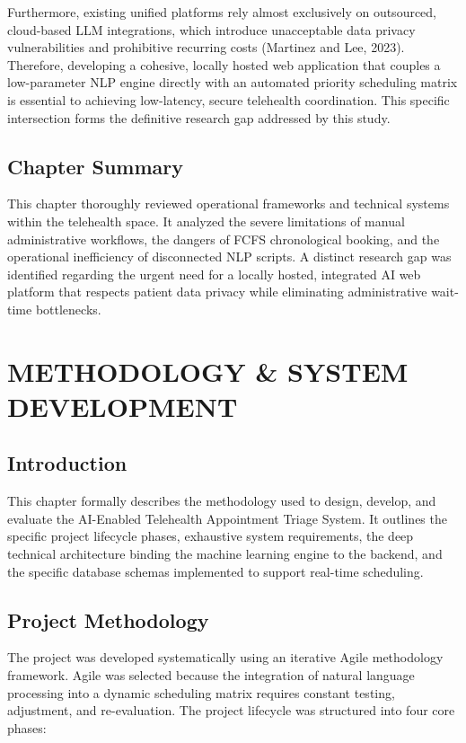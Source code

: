 \documentclass[12pt,a4paper]{report}
\begin{document}
Furthermore, existing unified platforms rely almost exclusively on outsourced, cloud-based LLM integrations, which introduce unacceptable data privacy vulnerabilities and prohibitive recurring costs (Martinez and Lee, 2023). Therefore, developing a cohesive, locally hosted web application that couples a low-parameter NLP engine directly with an automated priority scheduling matrix is essential to achieving low-latency, secure telehealth coordination. This specific intersection forms the definitive research gap addressed by this study.

\section{Chapter Summary}
This chapter thoroughly reviewed operational frameworks and technical systems within the telehealth space. It analyzed the severe limitations of manual administrative workflows, the dangers of FCFS chronological booking, and the operational inefficiency of disconnected NLP scripts. A distinct research gap was identified regarding the urgent need for a locally hosted, integrated AI web platform that respects patient data privacy while eliminating administrative wait-time bottlenecks.

\chapter{METHODOLOGY \& SYSTEM DEVELOPMENT}

\section{Introduction}
This chapter formally describes the methodology used to design, develop, and evaluate the AI-Enabled Telehealth Appointment Triage System. It outlines the specific project lifecycle phases, exhaustive system requirements, the deep technical architecture binding the machine learning engine to the backend, and the specific database schemas implemented to support real-time scheduling.

\section{Project Methodology}
The project was developed systematically using an iterative Agile methodology framework. Agile was selected because the integration of natural language processing into a dynamic scheduling matrix requires constant testing, adjustment, and re-evaluation. The project lifecycle was structured into four core phases:
\end{document}
